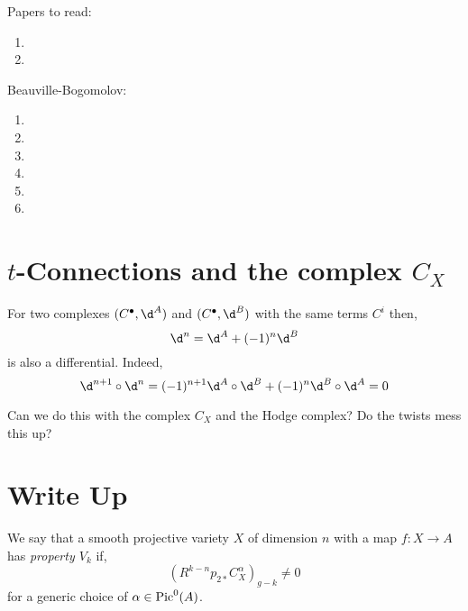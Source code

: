 \documentclass[12pt]{article}
\begin{document}
Papers to read:

\begin{enumerate}
\item {}

\item 
\end{enumerate}

Beauville-Bogomolov:

\begin{enumerate}
\item {}

\item {}

\item {}

\item {}

\item {}

\item 
\end{enumerate}

\section{$t$-Connections and the complex $C_X$}

For two complexes $(C^\bullet, \d^A)$ and $(C^\bullet, \d^B)$ with the same terms $C^i$ then,
\[ \d^n = \d^A + (-1)^n \d^B \]
is also a differential. Indeed,
\[ \d^{n+1} \circ \d^n = (-1)^{n+1} \d^A \circ \d^B + (-1)^{n} \d^B \circ \d^A = 0 \]

Can we do this with the complex $C_X$ and the Hodge complex? Do the twists mess this up?

\section{Write Up}

\begin{defn}
We say that a smooth projective variety $X$ of dimension $n$ with a map $f : X \to A$ has \textit{property $V_k$} if,
\[ (R^{k-n} p_{2*} C_X^\alpha)_{g-k} \neq 0 \]
for a generic choice of $\alpha \in \mathrm{Pic}^0(A)$.
\end{defn}
\end{document}
